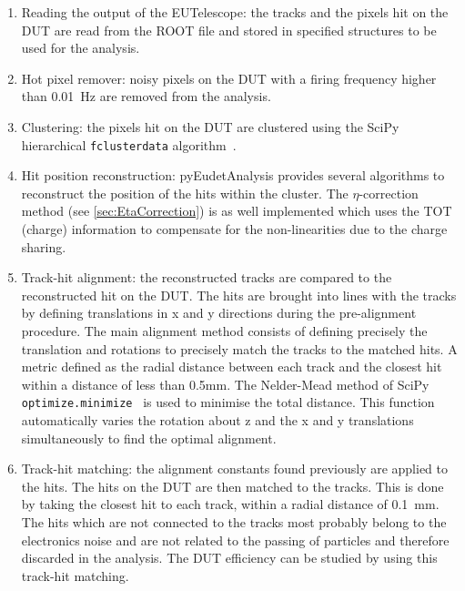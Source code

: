 \begin{enumerate}
\item Reading the output of the EUTelescope: the tracks and the pixels
  hit on the DUT are read from the ROOT file and stored in specified
  structures to be used for the analysis.

\item Hot pixel remover: noisy pixels on the DUT with a firing
  frequency higher than 0.01~Hz are removed from the analysis.

\item Clustering: the pixels hit on the DUT are clustered using the
  SciPy hierarchical \texttt{fclusterdata}
  algorithm~\cite{scipyClustering}.

\item Hit position reconstruction: pyEudetAnalysis provides several
  algorithms to reconstruct the position of the hits within the
  cluster. The $\eta$-correction method (see \cref{sec:EtaCorrection})
  is as well implemented which uses the TOT (charge) information to
  compensate for the non-linearities due to the charge sharing.

\item Track-hit alignment: the reconstructed tracks are compared to
  the reconstructed hit on the DUT. The hits are brought into lines
  with the tracks by defining translations in x and y directions
  during the pre-alignment procedure. The main alignment method
  consists of defining precisely the translation and rotations to
  precisely match the tracks to the matched hits. A metric defined as
  the radial distance between each track and the closest hit within a
  distance of less than 0.5mm. The Nelder-Mead method of SciPy
  \texttt{optimize.minimize}~\cite{SciPyOptimizeMinimize} is used to
  minimise the total distance. This function automatically varies the
  rotation about z and the x and y translations simultaneously to find
  the optimal alignment.

\item Track-hit matching: the alignment constants found previously are
  applied to the hits. The hits on the DUT are then matched to the
  tracks. This is done by taking the closest hit to each track, within
  a radial distance of 0.1~mm. The hits which are not connected to the
  tracks most probably belong to the electronics noise and are not
  related to the passing of particles and therefore discarded in the
  analysis. The DUT efficiency can be studied by using this track-hit
  matching.
\end{enumerate}